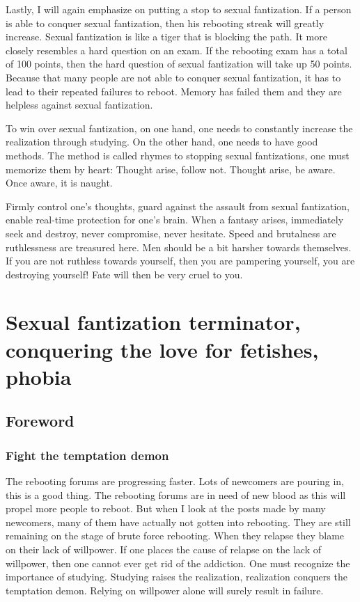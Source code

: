 \documentclass[
]{book}
\begin{document}
Lastly, I will again emphasize on putting a stop to sexual fantization. If a person is able to conquer sexual fantization, then his rebooting streak will greatly increase. Sexual fantization is like a tiger that is blocking the path. It more closely resembles a hard question on an exam. If the rebooting exam has a total of 100 points, then the hard question of sexual fantization will take up 50 points. Because that many people are not able to conquer sexual fantization, it has to lead to their repeated failures to reboot. Memory has failed them and they are helpless against sexual fantization.

To win over sexual fantization, on one hand, one needs to constantly increase the realization through studying. On the other hand, one needs to have good methods. The method is called rhymes to stopping sexual fantizations, one must memorize them by heart: Thought arise, follow not. Thought arise, be aware. Once aware, it is naught.

Firmly control one's thoughts, guard against the assault from sexual fantization, enable real-time protection for one's brain. When a fantasy arises, immediately seek and destroy, never compromise, never hesitate. Speed and brutalness are ruthlessness are treasured here. Men should be a bit harsher towards themselves. If you are not ruthless towards yourself, then you are pampering yourself, you are destroying yourself! Fate will then be very cruel to you.

\hypertarget{sexual-fantization-terminator-conquering-the-love-for-fetishes-phobia}{%
\chapter{Sexual fantization terminator, conquering the love for fetishes, phobia}\label{sexual-fantization-terminator-conquering-the-love-for-fetishes-phobia}}

\hypertarget{foreword-13}{%
\section{Foreword}\label{foreword-13}}

\hypertarget{fight-the-temptation-demon}{%
\subsection{Fight the temptation demon}\label{fight-the-temptation-demon}}

The rebooting forums are progressing faster. Lots of newcomers are pouring in, this is a good thing. The rebooting forums are in need of new blood as this will propel more people to reboot. But when I look at the posts made by many newcomers, many of them have actually not gotten into rebooting. They are still remaining on the stage of brute force rebooting. When they relapse they blame on their lack of willpower. If one places the cause of relapse on the lack of willpower, then one cannot ever get rid of the addiction. One must recognize the importance of studying. Studying raises the realization, realization conquers the temptation demon. Relying on willpower alone will surely result in failure.
\end{document}
